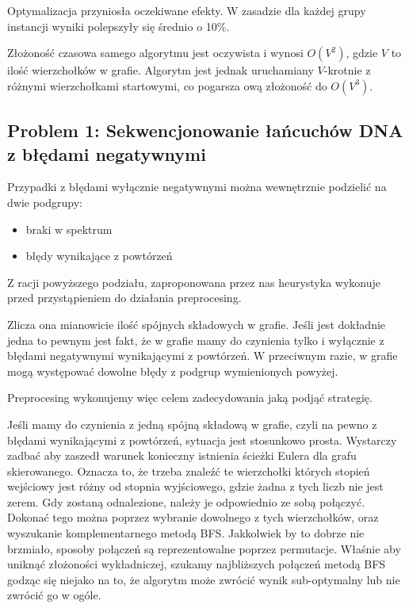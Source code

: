 \documentclass[a4paper]{article}
\begin{document}
Optymalizacja przyniosła oczekiwane efekty. W zasadzie dla każdej grupy instancji wyniki polepszyły się średnio o 10\%.

Złożoność czasowa samego algorytmu jest oczywista i wynosi $O(V^2)$, gdzie $V$ to ilość wierzchołków w grafie. Algorytm jest
jednak uruchamiany $V$-krotnie z różnymi wierzchołkami startowymi, co pogarsza ową złożoność do $O(V^3)$.


\subsection{Problem 1: Sekwencjonowanie łańcuchów DNA z błędami negatywnymi}
Przypadki z błędami wyłącznie negatywnymi można wewnętrznie podzielić na dwie podgrupy:
\begin{itemize}
\item braki w spektrum
\item błędy wynikające z powtórzeń
\end{itemize}
Z racji powyższego podziału, zaproponowana przez nas heurystyka wykonuje przed przystąpieniem do działania preprocesing.

Zlicza ona mianowicie ilość spójnych składowych w grafie. Jeśli jest dokładnie jedna to pewnym jest fakt, że w grafie
mamy do czynienia tylko i wyłącznie z błędami negatywnymi wynikającymi z powtórzeń. W przeciwnym razie, w grafie
mogą występować dowolne błędy z podgrup wymienionych powyżej.

Preprocesing wykonujemy więc celem zadecydowania jaką podjąć strategię.

Jeśli mamy do czynienia z jedną spójną składową w grafie, czyli na pewno z błędami wynikającymi z powtórzeń, sytuacja jest
stosunkowo prosta. Wystarczy zadbać aby zaszedł warunek konieczny istnienia ścieżki Eulera dla grafu skierowanego. 
Oznacza to, że trzeba znaleźć te wierzchołki których stopień wejściowy jest różny od stopnia wyjściowego, gdzie żadna
z tych liczb nie jest zerem. Gdy zostaną odnalezione, należy je odpowiednio ze sobą połączyć. Dokonać tego można poprzez
wybranie dowolnego z tych wierzchołków, oraz wyszukanie komplementarnego metodą BFS. Jakkolwiek by to dobrze nie brzmiało,
sposoby połączeń są reprezentowalne poprzez permutacje. Właśnie aby uniknąć złożoności wykładniczej, szukamy najbliższych
połączeń metodą BFS godząc się niejako na to, że algorytm może zwrócić wynik sub-optymalny lub nie zwrócić go w ogóle.
\end{document}

